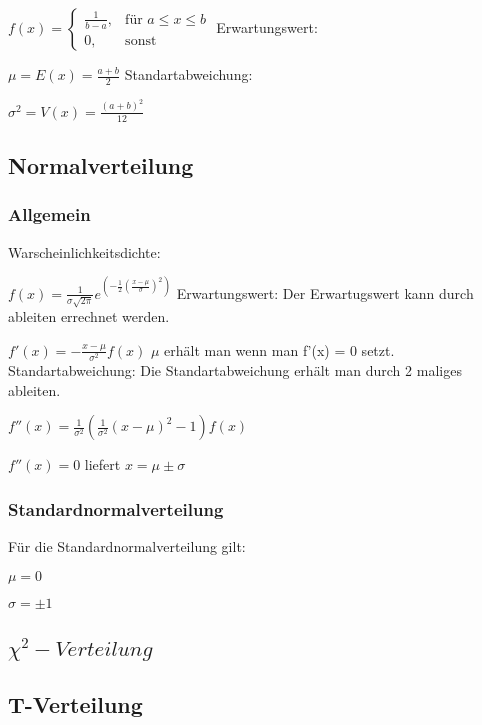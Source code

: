 \documentclass[a4paper, 11pt]{article}
\begin{document}
$f(x) = \begin {cases}
  \frac{1} {b-a}, & \text {für } a\le x \le b \\
  0, & \text{sonst}
\end{cases} $
\newline\newline Erwartungswert:

$ \mu = E(x) = \frac { a + b } {2}$
\newline\newline Standartabweichung:

$\sigma^2 = V(x)= \frac {(a + b)^2 } {12} $
\subsection{Normalverteilung}

\subsubsection{Allgemein}
Warscheinlichkeitsdichte: 

$f(x) = \frac{1} {\sigma \sqrt{2\pi}} e^{(-\frac{1}{2}(\frac{x-\mu}{\sigma})^2)}$
\newline\newline Erwartungswert:
\newline Der Erwartugswert kann durch ableiten errechnet werden.

$f'(x) = -\frac{x-\mu} {\sigma^2} f(x)$
$\mu$ erhält man wenn man f'(x) = 0 setzt.
\newline\newline Standartabweichung:
\newline Die Standartabweichung erhält man durch 2 maliges ableiten.


$f''(x) = \frac{1}{\sigma^2} (\frac{1}{\sigma^2} (x-\mu)^2 - 1) f(x)$


$f''(x) = 0 $ liefert $ x = \mu \pm \sigma$

\subsubsection{Standardnormalverteilung}
Für die Standardnormalverteilung gilt:


$\mu = 0$


$\sigma = \pm 1$

\subsection{$\chi^2-Verteilung$}
\subsection{T-Verteilung}
\end{document}
